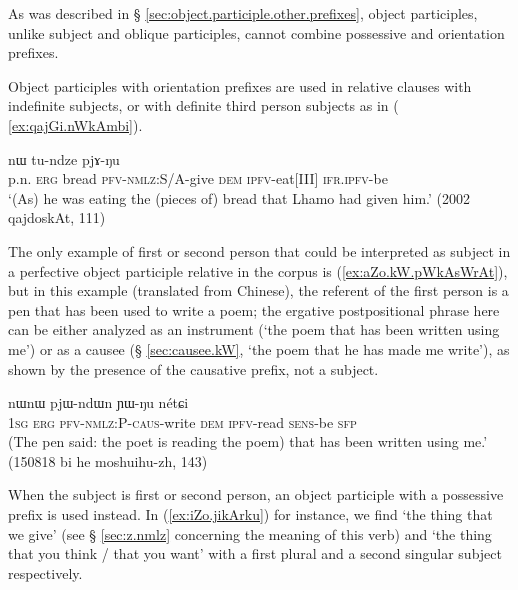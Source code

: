 As was described in § \ref{sec:object.participle.other.prefixes}, object participles, unlike subject and oblique participles, cannot combine possessive and orientation prefixes.

Object participles with orientation prefixes are used in relative clauses with indefinite subjects, or with definite third person subjects as in ( \ref{ex:qajGi.nWkAmbi}).  
 
\begin{exe}
\ex \label{ex:qajGi.nWkAmbi}
 nɯ tu-ndze pjɤ-ŋu \\
p.n. \textsc{erg} bread \textsc{pfv}-\textsc{nmlz}:S/A-give \textsc{dem} \textsc{ipfv}-eat[III] \textsc{ifr}.\textsc{ipfv}-be \\
\glt `(As) he was eating the (pieces of) bread that Lhamo had given him.' (2002 qajdoskAt, 111)
\end{exe}  

The only example of first or second person that could be interpreted as subject in a perfective object participle relative in the corpus is (\ref{ex:aZo.kW.pWkAsWrAt}), but in this example (translated from Chinese), the referent of the first person is a pen that has been used to write a poem; the ergative postpositional phrase  here can be either analyzed as an instrument (`the poem that has been written using me') or as a causee  (§ \ref{sec:causee.kW}, `the poem that he has made me write'), as shown by the presence of the causative  prefix, not a subject.

\begin{exe}
\ex \label{ex:aZo.kW.pWkAsWrAt}
 nɯnɯ pjɯ-ndɯn ɲɯ-ŋu nétɕi \\
\textsc{1sg} \textsc{erg} \textsc{pfv}-\textsc{nmlz}:P-\textsc{caus}-write \textsc{dem} \textsc{ipfv}-read \textsc{sens}-be \textsc{sfp} \\
\glt (The pen said: the poet is reading the poem) that has been written using me.' (150818 bi he moshuihu-zh, 143)
\end{exe}  

When the subject is first or second person, an object participle with a possessive prefix  is used instead. In (\ref{ex:iZo.jikArku}) for instance, we find  `the thing that we give' (see § \ref{sec:z.nmlz} concerning the meaning of this verb) and  `the thing that you think / that you want' with a first plural and a second singular subject respectively.


